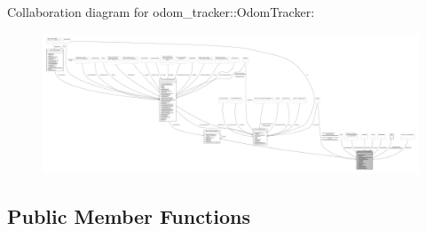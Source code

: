 Collaboration diagram for odom\+\_\+tracker\+:\+:Odom\+Tracker\+:
\nopagebreak
\begin{figure}[H]
\begin{center}
\leavevmode
\includegraphics[width=350pt]{classodom__tracker_1_1OdomTracker__coll__graph}
\end{center}
\end{figure}
\subsection*{Public Member Functions}
